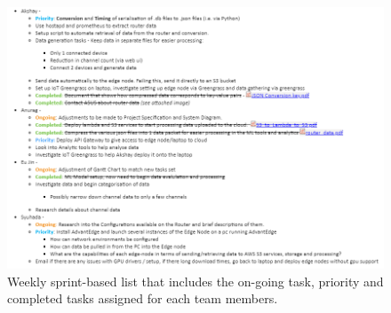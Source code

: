 \begin{figure}[ht]
    \centering
    \includegraphics[width=1\linewidth]{images/Task_list.png}
    \caption{Weekly sprint-based list that includes the on-going task, priority and completed tasks assigned for each team members.}
    \label{fig:task_list}
\end{figure}


